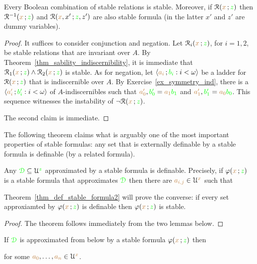 \begin{lemma}\label{lem_stab_Boole}
  Every Boolean combination of stable relations is stable.
  Moreover, if $\EuScript R({\color{brown} x}\,;{\color{green} z})$ then  $\EuScript R^{-1}({\color{brown} x}\,;{\color{green} z})$ and $\EuScript R({\color{brown} x},x'\,;{\color{green} z},z')$ are also stable formula (in the latter $x'$ and $z'$ are dummy variables).
\end{lemma}

\begin{proof}
  It suffices to consider conjunction and negation.
  Let $\EuScript R_i({\color{brown} x}\,;{\color{green} z})$, for $i=1,2$,  be stable relations that are invariant over $A$.
  By Theorem~\ref{thm_sability_indiscernibility}, it is immediate that $\EuScript R_1({\color{brown} x}\,;{\color{green} z})\wedge\EuScript R_2({\color{brown} x}\,;{\color{green} z})$ is stable.
  As for negation, let $\langle{\color{brown}a_i}\,;{\color{green} b_i} : i<\omega\rangle$ be a ladder for $\EuScript R({\color{brown} x}\,;{\color{green} z})$ that is indiscernible over $A$.
  By Exercise~\ref{ex_symmetry_ind}, there is a $\langle{\color{brown}a'_i}\,;{\color{green} b'_i} : i<\omega\rangle$ of $A$-indiscernibles such that ${\color{brown} a'_0},{\color{green} b'_0}={\color{brown} a_1}{\color{green} b_1}$ and ${\color{brown} a'_1},{\color{green} b'_1}={\color{brown} a_0}{\color{green} b_0}$.
  This sequence witnesses the instability of $\neg\EuScript R({\color{brown} x}\,;{\color{green} z})$.

  The second claim is immediate.
\end{proof}

The following theorem claims what is arguably one of the most important properties of stable formulas: any set that is externally definable by a stable formula is definable (by a related formula).

\begin{theorem}\label{thm_def_stable_formula}
Any ${\color{green}\EuScript D}\subseteq\EuScript U^{\color{green} z}$ approximated by a stable formula is definable.
Precisely, if $\varphi({\color{brown} x}\,;{\color{green} z})$ is a stable formula that approximates ${\color{green}\EuScript D}$ then there are ${\color{brown} a_{i,j}}\in\EuScript U^{\color{brown} x}$ such that 

\end{theorem}

Theorem~\ref{thm_def_stable_formula2} will prove the converse: if every set approxiamted by $\varphi({\color{brown} x}\,;{\color{green} z})$ is definable then $\varphi({\color{brown} x}\,;{\color{green} z})$ is stable.

\begin{proof}
  The theorem follows immediately from the two lemmas below.
\end{proof}

\begin{lemma}
If ${\color{green}\EuScript D}$ is approximated from below by a stable formula $\varphi({\color{brown} x}\,;{\color{green} z})$ then


for some ${\color{brown} a_0},\dots,{\color{brown} a_n}\in\EuScript U^{\color{brown} x}$. 
\end{lemma}


